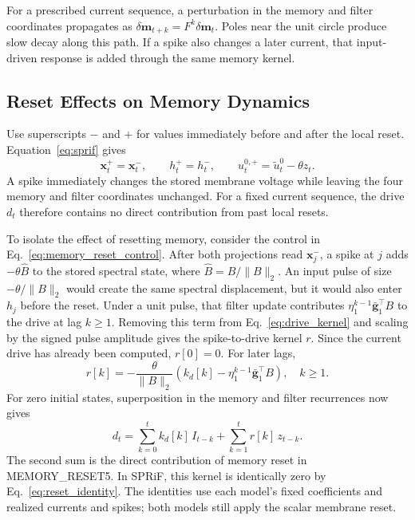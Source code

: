 \documentclass[letterpaper,journal]{IEEEtran}
\newcommand{\mr}{\textnormal{MEMORY\_RESET5}}
\begin{document}
For a prescribed current sequence, a perturbation in the memory and filter coordinates propagates as $\delta\mathbf m_{t+k}=F^k\delta\mathbf m_t$. Poles near the unit circle produce slow decay along this path. If a spike also changes a later current, that input-driven response is added through the same memory kernel.

\subsection{Reset Effects on Memory Dynamics}
\label{sec:reset}

Use superscripts $-$ and $+$ for values immediately before and after the local reset. Equation~\eqref{eq:sprif} gives
\begin{equation}
\mathbf x_t^+=\mathbf x_t^-,
\qquad h_t^+=h_t^-,
\qquad u_t^{0,+}=\widetilde u_t^0-\theta z_t.
\label{eq:reset_identity}
\end{equation}
A spike immediately changes the stored membrane voltage while leaving the four memory and filter coordinates unchanged. For a fixed current sequence, the drive $d_t$ therefore contains no direct contribution from past local resets.

To isolate the effect of resetting memory, consider the control in Eq.~\eqref{eq:memory_reset_control}. After both projections read $\mathbf x_j^-$, a spike at $j$ adds $-\theta\widehat B$ to the stored spectral state, where $\widehat B=B/\|B\|_2$. An input pulse of size $-\theta/\|B\|_2$ would create the same spectral displacement, but it would also enter $h_j$ before the reset. Under a unit pulse, that filter update contributes $\eta_1^{k-1}\bar{\mathbf g}_1^\top B$ to the drive at lag $k\geq1$. Removing this term from Eq.~\eqref{eq:drive_kernel} and scaling by the signed pulse amplitude gives the spike-to-drive kernel $r$. Since the current drive has already been computed, $r[0]=0$. For later lags,
\begin{equation}
r[k]=-\frac{\theta}{\|B\|_2}
\left(k_d[k]-\eta_1^{k-1}\bar{\mathbf g}_1^\top B\right),
\quad k\geq1 .
\label{eq:reset_kernel}
\end{equation}
For zero initial states, superposition in the memory and filter recurrences now gives
\begin{equation}
d_t=\sum_{k=0}^{t} k_d[k]\,I_{t-k}
    +\sum_{k=1}^{t} r[k]\,z_{t-k}.
\label{eq:drive_histories}
\end{equation}
The second sum is the direct contribution of memory reset in \mr{}. In SPRiF, this kernel is identically zero by Eq.~\eqref{eq:reset_identity}. The identities use each model's fixed coefficients and realized currents and spikes; both models still apply the scalar membrane reset.
\end{document}
